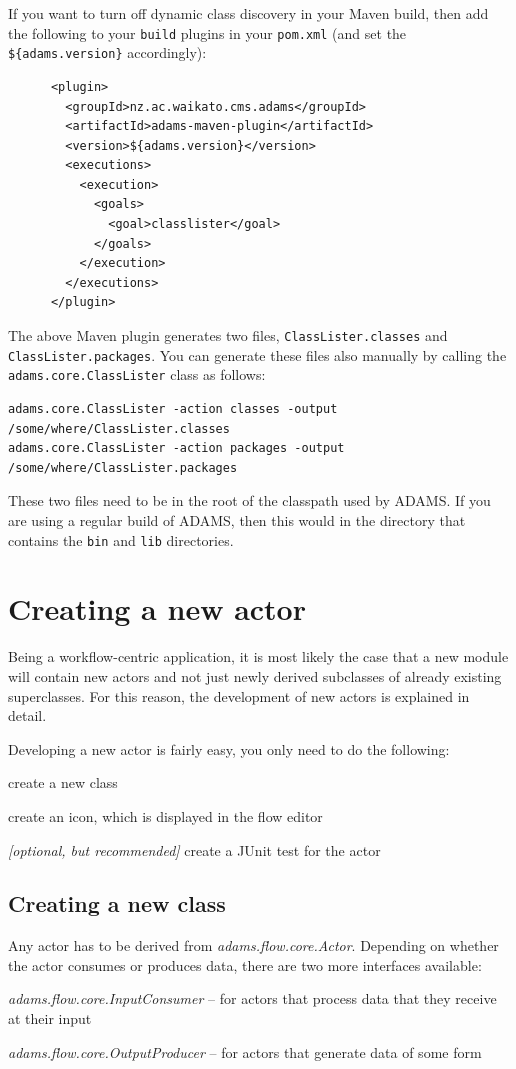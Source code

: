 If you want to turn off dynamic class discovery in your Maven build, then
add the following to your \texttt{build} plugins in your \texttt{pom.xml}
(and set the \verb|${adams.version}| accordingly):
\begin{verbatim}
      <plugin>
        <groupId>nz.ac.waikato.cms.adams</groupId>
        <artifactId>adams-maven-plugin</artifactId>
        <version>${adams.version}</version>
        <executions>
          <execution>
            <goals>
              <goal>classlister</goal>
            </goals>
          </execution>
        </executions>
      </plugin>
\end{verbatim}
The above Maven plugin generates two files, \texttt{ClassLister.classes}
and \texttt{ClassLister.packages}. You can generate these files also manually
by calling the \texttt{adams.core.ClassLister} class as follows:
\begin{verbatim}
adams.core.ClassLister -action classes -output /some/where/ClassLister.classes
adams.core.ClassLister -action packages -output /some/where/ClassLister.packages
\end{verbatim}
These two files need to be in the root of the classpath used by ADAMS. If you
are using a regular build of ADAMS, then this would in the directory that
contains the \texttt{bin} and \texttt{lib} directories.

\section{Creating a new actor}
Being a workflow-centric application, it is most likely the case that a new
module will contain new actors and not just newly derived subclasses of already
existing superclasses. For this reason, the development of new actors is
explained in detail.

Developing a new actor is fairly easy, you only need to do the following:
\begin{tight_itemize}
	\item create a new class
	\item create an icon, which is displayed in the flow editor
	\item \textit{[optional, but recommended]} create a JUnit test for the actor
\end{tight_itemize}

\subsection{Creating a new class}
Any actor has to be derived from \textit{adams.flow.core.Actor}.
Depending on whether the actor consumes or produces data, there are two more
interfaces available:
\begin{tight_itemize}
	\item \textit{adams.flow.core.InputConsumer} -- for actors that process data
	that they receive at their input
	\item \textit{adams.flow.core.OutputProducer} -- for actors that generate data
	of some form
\end{tight_itemize}


